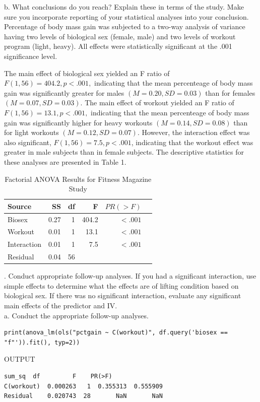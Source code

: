 \documentclass[onecolumn,10pt]{jhwhw}
\begin{document}
\noindent b. What conclusions do you reach? Explain these in terms of the study. Make sure you incorporate reporting of your statistical analyses into your conclusion.\\

Percentage of body mass gain was subjected to a two-way analysis of variance having two levels of biological sex (female, male) and two levels of workout program (light, heavy). All effects were statistically significant
at the .001 significance level.

The main effect of biological sex yielded an F ratio of $F(1, 56) = 404.2, p < .001,$ indicating that the mean percenteage of body mass gain was significantly greater for males $(M = 0.20, SD = 0.03)$ than for females $(M = 0.07, SD = 0.03)$. The main effect of workout yielded an F ratio of $F(1, 56) = 13.1, p < .001,$ indicating that the mean percenteage of body mass gain was significantly higher for heavy workouts $(M = 0.14, SD = 0.08)$ than for light workouts $(M = 0.12, SD = 0.07)$. However, the interaction effect was also significant, $F(1, 56) = 7.5, p < .001$, indicating that the workout effect was greater in male subjects than in female subjects. The descriptive statistics for these analyses are presented in Table 1. \\

\begin{table}[htdp]
\begin{center}
\begin{tabular}{l r r r r r}
\toprule
Source & SS & df & F & $PR(>F)$ \\
\midrule
Biosex       & 0.27 &  1  & 404.2 & $<.001$ \\
Workout      & 0.01 &  1  & 13.1  & $<.001$\\
Interaction  & 0.01 &  1  & 7.5   & $<.001$\\
Residual     & 0.04 & 56  & & \\
\bottomrule
\end{tabular}
\end{center}
\caption{Factorial ANOVA Results for Fitness Magazine Study}
\end{table}

. Conduct appropriate follow-up analyses. If you had a significant interaction, use simple effects to determine what the effects are of lifting condition based on biological sex. If there was no significant interaction, evaluate any significant main effects of the predictor and IV.
\\
\noindent a. Conduct the appropriate follow-up analyses.
\begin{lstlisting}
print(anova_lm(ols("pctgain ~ C(workout)", df.query('biosex == "f"')).fit(), typ=2))
\end{lstlisting}
\noindent OUTPUT
\begin{lstlisting}[language={}]
              sum_sq  df         F    PR(>F)
C(workout)  0.000263   1  0.355313  0.555909
Residual    0.020743  28       NaN       NaN
\end{lstlisting}
\end{document}
